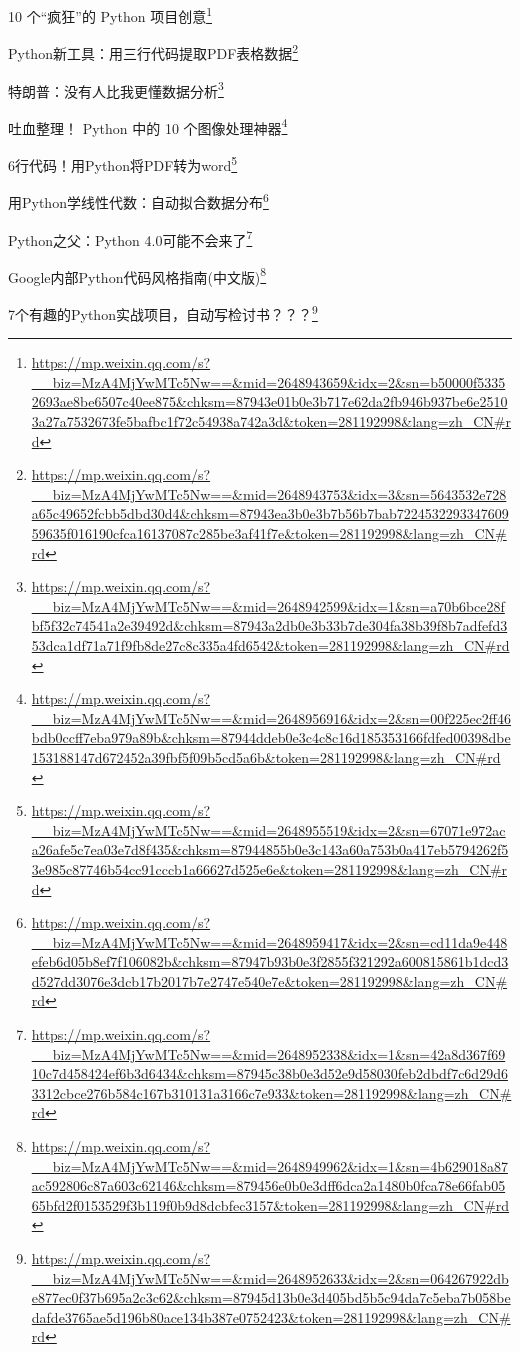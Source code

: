 \documentclass[]{ctexbook}
\renewcommand{\href}[2]{#2\footnote{\url{#1}}}
\begin{document}
\href{https://mp.weixin.qq.com/s?__biz=MzA4MjYwMTc5Nw==\&mid=2648943659\&idx=2\&sn=b50000f53352693ae8be6507c40ee875\&chksm=87943e01b0e3b717e62da2fb946b937be6e25103a27a7532673fe5bafbc1f72c54938a742a3d\&token=281192998\&lang=zh_CN\#rd}{10 个``疯狂''的 Python 项目创意}

\href{https://mp.weixin.qq.com/s?__biz=MzA4MjYwMTc5Nw==\&mid=2648943753\&idx=3\&sn=5643532e728a65c49652fcbb5dbd30d4\&chksm=87943ea3b0e3b7b56b7bab722453229334760959635f016190cfca16137087c285be3af41f7e\&token=281192998\&lang=zh_CN\#rd}{Python新工具：用三行代码提取PDF表格数据}

\href{https://mp.weixin.qq.com/s?__biz=MzA4MjYwMTc5Nw==\&mid=2648942599\&idx=1\&sn=a70b6bce28fbf5f32c74541a2e39492d\&chksm=87943a2db0e3b33b7de304fa38b39f8b7adfefd353dca1df71a71f9fb8de27c8c335a4fd6542\&token=281192998\&lang=zh_CN\#rd}{特朗普：没有人比我更懂数据分析}

\href{https://mp.weixin.qq.com/s?__biz=MzA4MjYwMTc5Nw==\&mid=2648956916\&idx=2\&sn=00f225ec2ff46bdb0ccff7eba979a89b\&chksm=87944ddeb0e3c4c8c16d185353166fdfed00398dbe153188147d672452a39fbf5f09b5cd5a6b\&token=281192998\&lang=zh_CN\#rd}{吐血整理！ Python 中的 10 个图像处理神器}

\href{https://mp.weixin.qq.com/s?__biz=MzA4MjYwMTc5Nw==\&mid=2648955519\&idx=2\&sn=67071e972aca26afe5c7ea03e7d8f435\&chksm=87944855b0e3c143a60a753b0a417eb5794262f53e985c87746b54cc91cccb1a66627d525e6e\&token=281192998\&lang=zh_CN\#rd}{6行代码！用Python将PDF转为word}

\href{https://mp.weixin.qq.com/s?__biz=MzA4MjYwMTc5Nw==\&mid=2648959417\&idx=2\&sn=cd11da9e448efeb6d05b8ef7f106082b\&chksm=87947b93b0e3f2855f321292a600815861b1dcd3d527dd3076e3dcb17b2017b7e2747e540e7e\&token=281192998\&lang=zh_CN\#rd}{用Python学线性代数：自动拟合数据分布}

\href{https://mp.weixin.qq.com/s?__biz=MzA4MjYwMTc5Nw==\&mid=2648952338\&idx=1\&sn=42a8d367f6910c7d458424ef6b3d6434\&chksm=87945c38b0e3d52e9d58030feb2dbdf7c6d29d63312cbce276b584c167b310131a3166c7e933\&token=281192998\&lang=zh_CN\#rd}{Python之父：Python 4.0可能不会来了}

\href{https://mp.weixin.qq.com/s?__biz=MzA4MjYwMTc5Nw==\&mid=2648949962\&idx=1\&sn=4b629018a87ac592806c87a603c62146\&chksm=879456e0b0e3dff6dca2a1480b0fca78e66fab0565bfd2f0153529f3b119f0b9d8dcbfec3157\&token=281192998\&lang=zh_CN\#rd}{Google内部Python代码风格指南(中文版)}

\href{https://mp.weixin.qq.com/s?__biz=MzA4MjYwMTc5Nw==\&mid=2648952633\&idx=2\&sn=064267922dbe877ec0f37b695a2c3c62\&chksm=87945d13b0e3d405bd5b5c94da7c5eba7b058bedafde3765ae5d196b80ace134b387e0752423\&token=281192998\&lang=zh_CN\#rd}{7个有趣的Python实战项目，自动写检讨书？？？}
\end{document}
